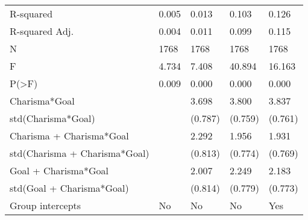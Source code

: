 \begin{tabular}{lllll}
R-squared                     &         0.005 &         0.013 &         0.103 &         0.126 \\
R-squared Adj.                &         0.004 &         0.011 &         0.099 &         0.115 \\
N                             &          1768 &          1768 &          1768 &          1768 \\
F                             &         4.734 &         7.408 &        40.894 &        16.163 \\
P(>F)                         &         0.009 &         0.000 &         0.000 &         0.000 \\
Charisma*Goal                 &               &         3.698 &         3.800 &         3.837 \\
std(Charisma*Goal)            &               &       (0.787) &       (0.759) &       (0.761) \\
Charisma + Charisma*Goal      &               &         2.292 &         1.956 &         1.931 \\
std(Charisma + Charisma*Goal) &               &       (0.813) &       (0.774) &       (0.769) \\
Goal + Charisma*Goal          &               &         2.007 &         2.249 &         2.183 \\
std(Goal + Charisma*Goal)     &               &       (0.814) &       (0.779) &       (0.773) \\
Group intercepts              &            No &            No &            No &           Yes \\
\bottomrule
\end{tabular}

